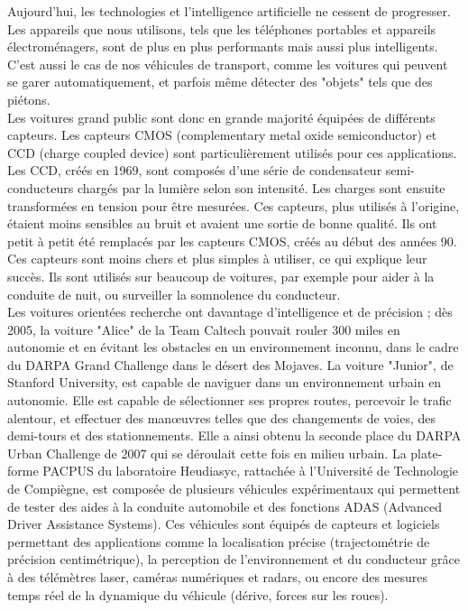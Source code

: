 Aujourd'hui, les technologies et l'intelligence artificielle ne cessent de progresser. Les appareils que nous utilisons, tels que les téléphones portables et appareils électroménagers, sont de plus en plus performants mais aussi plus intelligents. C'est aussi le cas de nos véhicules de transport, comme les voitures qui peuvent se garer automatiquement, et parfois même détecter des "objets" tels que des piétons.\\

Les voitures grand public sont donc en grande majorité équipées de différents capteurs. Les capteurs CMOS (complementary metal oxide semiconductor) et CCD (charge coupled device) sont particulièrement utilisés pour ces applications. Les CCD, créés en 1969, sont composés d'une série de condensateur semi-conducteurs chargés par la lumière selon son intensité. Les charges sont ensuite transformées en tension pour être mesurées. Ces capteurs, plus utilisés à l'origine, étaient moins sensibles au bruit et avaient une sortie de bonne qualité. Ils ont petit à petit été remplacés par les capteurs CMOS, créés au début des années 90. Ces capteurs sont moins chers et plus simples à utiliser, ce qui explique leur succès. Ils sont utilisés sur beaucoup de voitures, par exemple pour aider à la conduite de nuit, ou surveiller la somnolence du conducteur.\\

Les voitures orientées recherche ont davantage d'intelligence et de précision ; dès 2005, la voiture "Alice" de la Team Caltech pouvait rouler 300 miles en autonomie et en évitant les obstacles en un environnement inconnu, dans le cadre du DARPA Grand Challenge dans le désert des Mojaves. La voiture "Junior", de Stanford University, est capable de naviguer dans un environnement urbain en autonomie. Elle est capable de sélectionner ses propres routes, percevoir le trafic alentour, et effectuer des manœuvres telles que des changements de voies, des demi-tours et des stationnements. Elle a ainsi obtenu la seconde place du DARPA Urban Challenge de 2007 qui se déroulait cette fois en milieu urbain. La plate-forme PACPUS du laboratoire Heudiasyc, rattachée à l'Université de Technologie de Compiègne, est composée de plusieurs véhicules expérimentaux qui permettent de tester des aides à la conduite automobile et des fonctions ADAS (Advanced Driver Assistance Systems). Ces véhicules sont équipés de capteurs et logiciels permettant des applications comme la localisation précise (trajectométrie de précision centimétrique), la perception de l'environnement et du conducteur grâce à des télémètres laser, caméras numériques et radars, ou encore des mesures temps réel de la dynamique du véhicule (dérive, forces sur les roues).\\

